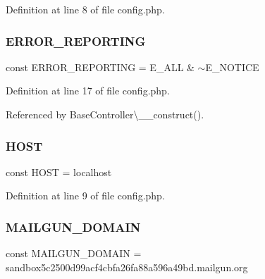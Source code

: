 Definition at line 8 of file config.\+php.

\hypertarget{config_8php_a80c2f40a4ce1ad3cbfb1978239f63c31}{}\label{config_8php_a80c2f40a4ce1ad3cbfb1978239f63c31} 
\subsubsection{\texorpdfstring{E\+R\+R\+O\+R\+\_\+\+R\+E\+P\+O\+R\+T\+I\+NG}{ERROR\_REPORTING}}
{\footnotesize\ttfamily const E\+R\+R\+O\+R\+\_\+\+R\+E\+P\+O\+R\+T\+I\+NG = E\+\_\+\+A\+LL \& $\sim$E\+\_\+\+N\+O\+T\+I\+CE}



Definition at line 17 of file config.\+php.



Referenced by Base\+Controller\textbackslash{}\+\_\+\+\_\+construct().

\hypertarget{config_8php_a6768772c01f2d4f111fabd25012e8259}{}\label{config_8php_a6768772c01f2d4f111fabd25012e8259} 
\subsubsection{\texorpdfstring{H\+O\+ST}{HOST}}
{\footnotesize\ttfamily const H\+O\+ST = \textquotesingle{}localhost\textquotesingle{}}



Definition at line 9 of file config.\+php.

\hypertarget{config_8php_a2de069ac064bb137af53d99e3fcff3c8}{}\label{config_8php_a2de069ac064bb137af53d99e3fcff3c8} 
\subsubsection{\texorpdfstring{M\+A\+I\+L\+G\+U\+N\+\_\+\+D\+O\+M\+A\+IN}{MAILGUN\_DOMAIN}}
{\footnotesize\ttfamily const M\+A\+I\+L\+G\+U\+N\+\_\+\+D\+O\+M\+A\+IN = \textquotesingle{}sandbox5c2500d99acf4cbfa26fa88a596a49bd.\+mailgun.\+org\textquotesingle{}}



